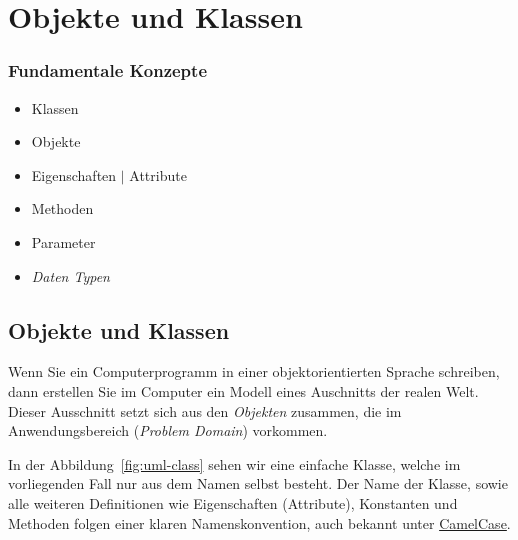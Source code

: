
\section{Objekte und Klassen}
\label{sec:contents}

\begin{frame}[fragile]
    \frametitle<presentation>{Fundamentale Konzepte}

    \begin{itemize}
        \item Klassen
        \item Objekte
        \item Eigenschaften $|$ Attribute
        \item Methoden
        \item Parameter
        \item \emph{Daten Typen}
    \end{itemize}
\end{frame}


\subsection{Objekte und Klassen}
\label{subsec:objects-classes}

Wenn Sie ein Computerprogramm in einer objektorientierten Sprache schreiben,
dann erstellen Sie im Computer ein Modell eines Auschnitts der realen Welt.
Dieser Ausschnitt setzt sich aus den \emph{Objekten} zusammen, die im
Anwendungsbereich (\emph{Problem Domain}) vorkommen.


In der Abbildung~\ref{fig:uml-class} sehen wir eine einfache Klasse,
welche im vorliegenden Fall nur aus dem Namen selbst besteht. Der Name der Klasse,
sowie alle weiteren Definitionen wie Eigenschaften (Attribute), Konstanten und Methoden
folgen einer klaren Namenskonvention, auch bekannt unter
\href{https://www.geeksforgeeks.org/java-naming-conventions/}{CamelCase}.

